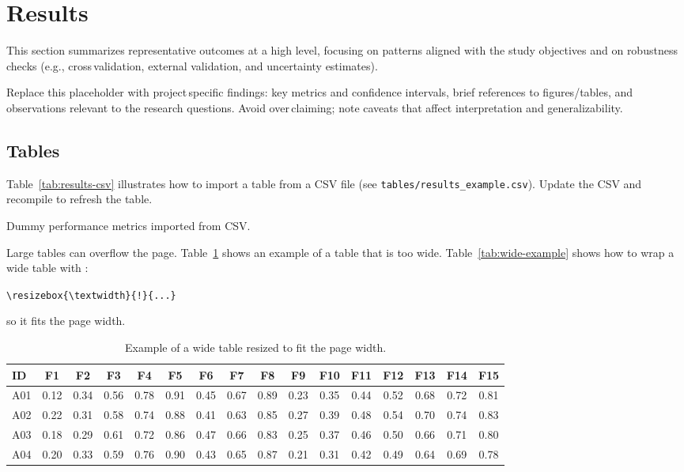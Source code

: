 \section{Results}

\noindent This section summarizes representative outcomes at a high level, focusing on patterns aligned with the study objectives and on robustness checks (e.g., cross\,validation, external validation, and uncertainty estimates).

\noindent Replace this placeholder with project\,specific findings: key metrics and confidence intervals, brief references to figures/tables, and observations relevant to the research questions. Avoid over\,claiming; note caveats that affect interpretation and generalizability.

\subsection{Tables}

\noindent Table~\ref{tab:results-csv} illustrates how to import a table from a CSV file (see \texttt{tables/results\_example.csv}). Update the CSV and recompile to refresh the table.

\begin{table}[h]
  \centering
  \caption{Dummy performance metrics imported from CSV.}
  \label{tab:results-csv}
\end{table}

\noindent Large tables can overflow the page. Table~\ref{tab:too-wide-example} shows an example of a table that is too wide. Table~\ref{tab:wide-example} shows how to wrap a wide table with :


\begin{center}
    \verb|\resizebox{\textwidth}{!}{...}| 
\end{center}

\noindent so it fits the page width.

\begin{table}[htbp]
    \centering
    \begin{tabular}{lccccccccccccccc}
        \toprule
        ID & F1 & F2 & F3 & F4 & F5 & F6 & F7 & F8 & F9 & F10 & F11 & F12 & F13 & F14 & F15 \\
        \midrule
        A01 & 0.12 & 0.34 & 0.56 & 0.78 & 0.91 & 0.45 & 0.67 & 0.89 & 0.23 & 0.35 & 0.44 & 0.52 & 0.68 & 0.72 & 0.81 \\
        A02 & 0.22 & 0.31 & 0.58 & 0.74 & 0.88 & 0.41 & 0.63 & 0.85 & 0.27 & 0.39 & 0.48 & 0.54 & 0.70 & 0.74 & 0.83 \\
        A03 & 0.18 & 0.29 & 0.61 & 0.72 & 0.86 & 0.47 & 0.66 & 0.83 & 0.25 & 0.37 & 0.46 & 0.50 & 0.66 & 0.71 & 0.80 \\
        A04 & 0.20 & 0.33 & 0.59 & 0.76 & 0.90 & 0.43 & 0.65 & 0.87 & 0.21 & 0.31 & 0.42 & 0.49 & 0.64 & 0.69 & 0.78 \\
        \bottomrule
    \end{tabular}
    \caption{Example of a wide table resized to fit the page width.}
    \label{tab:too-wide-example}
\end{table}


